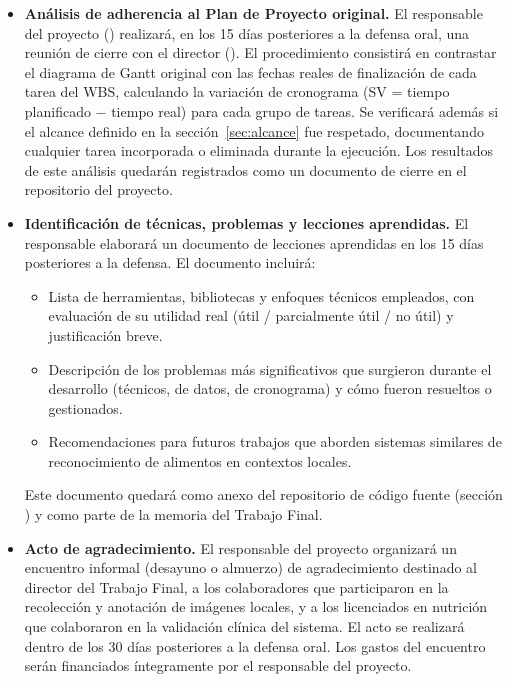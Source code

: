 \documentclass[
11pt, %
]{charter}
\begin{document}
\begin{itemize}

\item \textbf{Análisis de adherencia al Plan de Proyecto original.}
El responsable del proyecto (\authorname) realizará, en los 15 días posteriores a la defensa oral, una reunión de cierre con el director (\supname). El procedimiento consistirá en contrastar el diagrama de Gantt original con las fechas reales de finalización de cada tarea del WBS, calculando la variación de cronograma (SV = tiempo planificado $-$ tiempo real) para cada grupo de tareas. Se verificará además si el alcance definido en la sección~\ref{sec:alcance} fue respetado, documentando cualquier tarea incorporada o eliminada durante la ejecución. Los resultados de este análisis quedarán registrados como un documento de cierre en el repositorio del proyecto.

\item \textbf{Identificación de técnicas, problemas y lecciones aprendidas.}
El responsable elaborará un documento de lecciones aprendidas en los 15 días posteriores a la defensa. El documento incluirá:
\begin{itemize}
	\item[a)] Lista de herramientas, bibliotecas y enfoques técnicos empleados, con evaluación de su utilidad real (útil / parcialmente útil / no útil) y justificación breve.
	\item[b)] Descripción de los problemas más significativos que surgieron durante el desarrollo (técnicos, de datos, de cronograma) y cómo fueron resueltos o gestionados.
	\item[c)] Recomendaciones para futuros trabajos que aborden sistemas similares de reconocimiento de alimentos en contextos locales.
\end{itemize}
Este documento quedará como anexo del repositorio de código fuente (sección ) y como parte de la memoria del Trabajo Final.

\item \textbf{Acto de agradecimiento.}
El responsable del proyecto organizará un encuentro informal (desayuno o almuerzo) de agradecimiento destinado al director del Trabajo Final, a los colaboradores que participaron en la recolección y anotación de imágenes locales, y a los licenciados en nutrición que colaboraron en la validación clínica del sistema. El acto se realizará dentro de los 30 días posteriores a la defensa oral. Los gastos del encuentro serán financiados íntegramente por el responsable del proyecto.

\end{itemize}

\newpage


\end{document}
